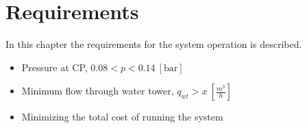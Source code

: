\chapter{Requirements}
\label{Requirements}

In this chapter the requirements for the system operation is described. 



\begin{itemize}
	\item Pressure at CP, $0.08 < p < 0.14 \:[\text{bar}]$
%
	\item Minimum flow through water tower, $q_{wt} > x \:[\frac{m^3}{h}]$
%
	\item Minimizing the total cost of running the system
\end{itemize}